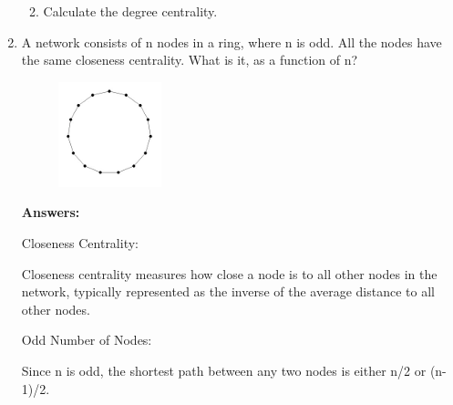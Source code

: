 \documentclass{amsart}
\theoremstyle{definition}
\theoremstyle{remark}
\numberwithin{equation}{section}
\begin{document}
\begin{enumerate}
\begin{enumerate}

\vspace{0.2cm}
\item Calculate the degree centrality. \vspace{0.2cm}

\vspace{0.2cm}
\end{enumerate}
\clearpage

\item A network consists of n nodes in a ring, where n is odd. All the nodes have the same closeness centrality. What is it, as a function of n? \vspace{0.2cm}


\begin{figure}[h]
\includegraphics[width=0.2\linewidth]{images/hw3_figure1.PNG}
\end{figure}

\vspace{0.2cm}

\textbf{Answers:}

Closeness Centrality:

Closeness centrality measures how close a node is to all other nodes in the network, typically represented as the inverse of the average distance to all other nodes.

Odd Number of Nodes:

Since n is odd, the shortest path between any two nodes is either n/2 or (n-1)/2.


\end{enumerate}
\end{document}
